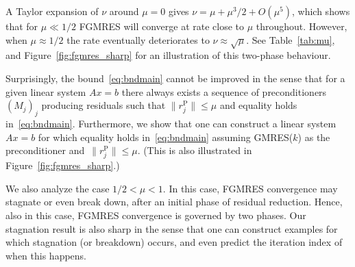 \documentclass{siamart251216}
\begin{document}
A Taylor expansion of $\nu$ around $\mu=0$ gives $\nu = \mu + \mu^3/2 + O(\mu^5)$, which shows that for $\mu \ll 1/2$ FGMRES will converge at rate close to $\mu$ throughout. However, when $\mu\approx 1/2$ the rate eventually deteriorates to $\nu \approx \sqrt{\mu}$. See Table~\ref{tab:mu}, and Figure~\ref{fig:fgmres_sharp} for an illustration of this two-phase behaviour.

\begin{table}
\label{tab:mu}
\centering
\caption{The two phases of FGMRES convergence, dependent on the residual tolerance $\mu<1$ of the preconditioner. For $\mu\leq 1/2$, FGMRES first converges geometrically at rate $\mu$ and then deteriorates to rate $\nu = \sin(\frac{1}{2} \arcsin(2\mu))$. For $\mu\approx 0.5$, this deterioration is noticeable while for smaller $\mu$ the rate remains practically constant. For $\mu>1/2$, FGMRES may stagnate after an initial phase of residual reduction.}
\small
\label{table1}
\end{table}


Surprisingly, the bound~\eqref{eq:bndmain} cannot be improved in the sense that for a given linear system $Ax = b$ there always exists a sequence of preconditioners~$(M_j)_j$ producing residuals such that $\|r_j^{\mathrm{P}}\| \leq \mu$ and equality holds in~\eqref{eq:bndmain}. Furthermore, we show that one can construct a linear system $Ax = b$ for which equality holds in~\eqref{eq:bndmain} assuming GMRES($k$) as the preconditioner and~$\|r_j^{\mathrm{P}}\| \leq \mu$. (This is also illustrated in Figure~\ref{fig:fgmres_sharp}.)

We also analyze the case $1/2 < \mu < 1$. In this case, FGMRES convergence may stagnate or even break down, after an initial phase of residual reduction. Hence, also in this case, FGMRES convergence is governed by two phases. Our stagnation result is also sharp in the sense that one can construct examples for which stagnation (or breakdown) occurs, and even predict the iteration index of when this happens.
\end{document}
